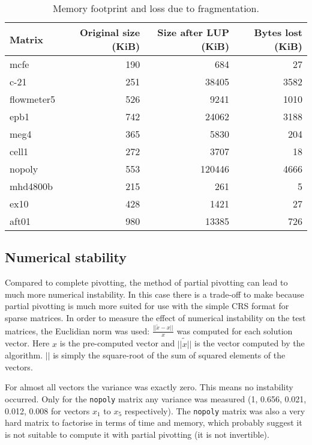 \documentclass[10pt,a4paper]{article}
\begin{document}
\begin{table}
\begin{tabular}{|l|rrr|}
\hline 
Matrix & Original size (KiB) & Size after LUP (KiB) & Bytes lost (KiB)\\ 
\hline 
mcfe & 190  & 684  & 27  \\
c-21 & 251  & 38405  & 3582  \\ 
flowmeter5 & 526  & 9241  & 1010  \\ 
epb1 & 742  & 24062  & 3188  \\ 
meg4 & 365  & 5830  & 204  \\ 
cell1 & 272  & 3707  & 18  \\ 
nopoly & 553  & 120446  & 4666  \\ 
mhd4800b & 215  & 261  & 5  \\ 
ex10 & 428  & 1421  & 27  \\ 
aft01 & 980  & 13385  & 726  \\ 
\hline 
\end{tabular} 
\label{mem}
\caption{Memory footprint and loss due to fragmentation.}
\end{table}

\subsection{Numerical stability}

Compared to complete pivotting, the method of partial pivotting can lead to much more numerical instability. In this case there is a trade-off to make because partial pivotting is much more suited for use with the simple CRS format for sparse matrices. In order to measure the effect of numerical instability on the test matrices, the Euclidian norm was used: $\frac{||\tilde{x}-x||}{x}$ was computed for each solution vector. Here $x$ is the pre-computed vector and $\tilde{||x||}$ is the vector computed by the algorithm. $||$ is simply the square-root of the sum of squared elements of the vectors.

For almost all vectors the variance was exactly zero. This means no instability occurred. Only for the \texttt{nopoly} matrix any variance was measured (1, 0.656, 0.021, 0.012, 0.008 for vectors $x_1$ to $x_5$ respectively). The \texttt{nopoly} matrix was also a very hard matrix to factorise in terms of time and memory, which probably suggest it is not suitable to compute it with partial pivotting (it is not invertible).
\end{document}
